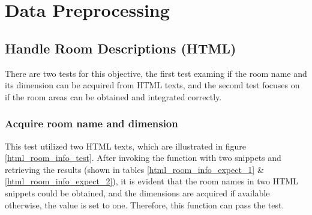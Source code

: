 \documentclass[12pt,twoside]{report}
\begin{document}
\section{Data Preprocessing}

\subsection{Handle Room Descriptions (HTML)}
There are two tests for this objective, the first test examing if the room name and its dimension can be acquired  from HTML texts, and the second test focuses on if the room areas can be obtained and integrated correctly. 

\subsubsection{Acquire room name and dimension}
This test utilized two HTML texts, which are illustrated in figure \ref{html_room_info_test}. After invoking the function  with two snippets and retrieving the results (shown in tables \ref{html_room_info_expect_1} \& \ref{html_room_info_expect_2}), it is evident that the room names in two HTML snippets could be obtained, and the dimensions are acquired if available otherwise, the value is set to one. Therefore, this function can pass the test.
\end{document}
